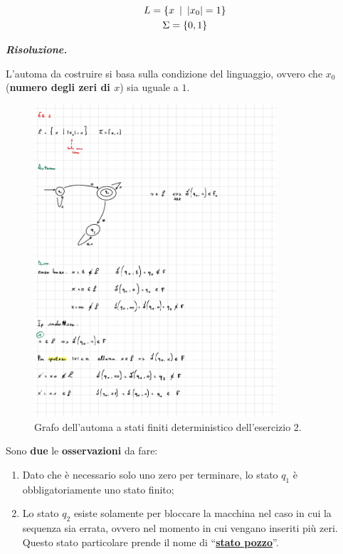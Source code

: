 \documentclass[a4paper]{article}
\newcommand{\dquotes}[1]{``#1''}
\begin{document}
	\begin{gather*}
		L = \left\{x \hspace{0.5em} | \hspace{0.5em} |x_{0}| = 1\right\} \\
		\Sigma = \left\{0, 1\right\}
	\end{gather*}\newline

	\noindent
	\textcolor{Green4}{\textbf{\emph{Risoluzione.}}}\newline
	
	\noindent
	L'automa da costruire si basa sulla condizione del linguaggio, ovvero che $x_{0}$ (\textbf{numero degli zeri di $x$}) sia uguale a $1$.
	
	\begin{figure}[!htp]
		\centering
		\includegraphics[width=0.8\textwidth]{img/esercitazioni/01_exe2.pdf}
		\caption{Grafo dell'automa a stati finiti deterministico dell'esercizio 2.}\label{ASFD-esercizio_2}
	\end{figure}
	
	\noindent
	Sono \textbf{due} le \textbf{osservazioni} da fare: 
	
	\begin{enumerate}
		\item Dato che è necessario solo uno zero per terminare, lo stato $q_{1}$ è obbligatoriamente uno stato finito;
		\item Lo stato $q_{2}$ esiste solamente per bloccare la macchina nel caso in cui la sequenza sia errata, ovvero nel momento in cui vengano inseriti più zeri. Questo stato particolare prende il nome di \dquotes{\textbf{\underline{stato pozzo}}}.
	\end{enumerate}
\end{document}
